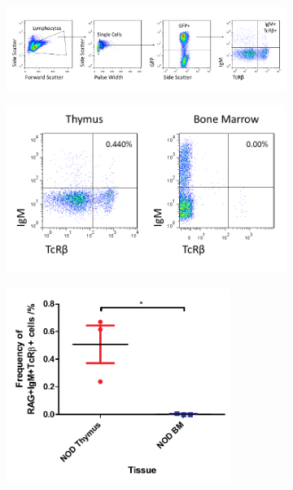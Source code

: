 \begin{figure}
	\begin{subfigure}{\textwidth}
	\caption{}
	\includegraphics[width=\textwidth]{Figures/IgMTcRGating.pdf}
	\label{subfig:IgMTcRGating}
	\end{subfigure}
	\centering
	\begin{subfigure}{0.6\textwidth}
	\caption{}
	\includegraphics[width=\textwidth]{Figures/ThyvBMIgMTcR.png}	
	\label{subfig:BMvThyRAGIgMTcR}
	\end{subfigure}
	\centering
	\begin{subfigure}{0.5\textwidth}
	\caption{}
	\centering
	\includegraphics[width=0.8\textwidth]{Figures/NewTcRIgMgraph.pdf}	

\end{subfigure}
\end{figure}
